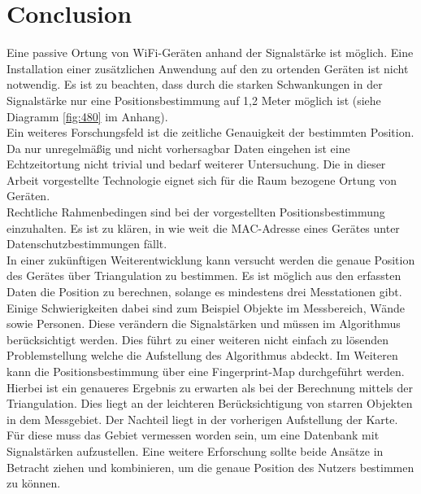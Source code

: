 \documentclass[a4paper]{spie}  %
\begin{document}
\section{Conclusion}
Eine passive Ortung von WiFi-Geräten anhand der Signalstärke ist möglich. Eine Installation einer zusätzlichen Anwendung auf den zu ortenden Geräten ist nicht notwendig. Es ist zu beachten, dass durch die starken Schwankungen in der Signalstärke nur eine  Positionsbestimmung auf 1,2 Meter möglich ist (siehe Diagramm \ref{fig:480} im Anhang).
\\
Ein weiteres Forschungsfeld ist die zeitliche Genauigkeit der bestimmten Position. Da nur unregelmäßig und nicht vorhersagbar Daten eingehen ist eine Echtzeitortung nicht trivial und bedarf weiterer Untersuchung.
Die in dieser Arbeit vorgestellte Technologie eignet sich für die Raum bezogene Ortung von Geräten. 
\\
Rechtliche Rahmenbedingen sind bei der vorgestellten Positionsbestimmung einzuhalten. Es ist zu klären, in wie weit die MAC-Adresse eines Gerätes unter Datenschutzbestimmungen fällt.
\\
In einer zukünftigen Weiterentwicklung kann versucht werden die genaue Position des Gerätes über Triangulation zu bestimmen. Es ist möglich aus den erfassten Daten die Position zu berechnen, solange es mindestens drei Messtationen gibt. Einige Schwierigkeiten dabei sind zum Beispiel Objekte im Messbereich, Wände sowie Personen. Diese verändern die Signalstärken und müssen im Algorithmus berücksichtigt werden. Dies führt zu einer weiteren nicht einfach zu lösenden Problemstellung welche die Aufstellung des Algorithmus abdeckt. \linebreak
\linebreak
Im Weiteren kann die Positionsbestimmung über eine Fingerprint-Map durchgeführt werden. Hierbei ist ein genaueres Ergebnis zu erwarten als bei der Berechnung mittels der Triangulation. Dies liegt an der leichteren Berücksichtigung von starren Objekten in dem Messgebiet. Der Nachteil liegt in der vorherigen Aufstellung der Karte. Für diese muss das Gebiet vermessen worden sein, um eine Datenbank mit Signalstärken aufzustellen. 
\linebreak
Eine weitere Erforschung sollte beide Ansätze in Betracht ziehen und kombinieren, um die genaue Position des Nutzers bestimmen zu können.


\newpage
\end{document}
